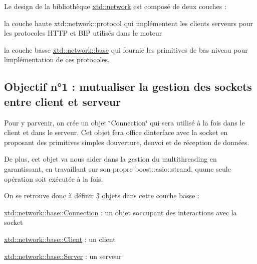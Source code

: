 Le design de la bibliothèque \hyperlink{namespacextd_1_1network}{xtd\+::network} est composé de deux couches \+:
\begin{DoxyItemize}
\item la couche haute xtd\+::network\+::protocol qui implémentent les clients serveurs pour les protocoles H\+T\+TP et B\+IP utilisés dans le moteur
\item la couche basse \hyperlink{namespacextd_1_1network_1_1base}{xtd\+::network\+::base} qui fournie les primitives de bas niveau pour l\textquotesingle{}implémentation de ces protocoles.
\end{DoxyItemize}\hypertarget{index_ssec_design_obj1}{}\subsection{Objectif n°1 \+: mutualiser la gestion des sockets entre client et serveur}\label{index_ssec_design_obj1}
Pour y parvenir, on crée un objet \char`\"{}\+Connection\char`\"{} qui sera utilisé à la fois dans le client et dans le serveur. Cet objet fera office d\textquotesingle{}interface avec la socket en proposant des primitives simples d\textquotesingle{}ouverture, d\textquotesingle{}envoi et de réception de données.

De plus, cet objet va nous aider dans la gestion du multithreading en garantissant, en travaillant sur son propre boost\+::asio\+::strand, qu\textquotesingle{}une seule opération soit exécutée à la fois.

On se retrouve donc à définir 3 objets dans cette couche basse \+:
\begin{DoxyItemize}
\item \hyperlink{classxtd_1_1network_1_1base_1_1Connection}{xtd\+::network\+::base\+::\+Connection} \+: un objet s\textquotesingle{}occupant des interactions avec la socket
\item \hyperlink{classxtd_1_1network_1_1base_1_1Client}{xtd\+::network\+::base\+::\+Client} \+: un client
\item \hyperlink{classxtd_1_1network_1_1base_1_1Server}{xtd\+::network\+::base\+::\+Server} \+: un serveur
\end{DoxyItemize}



